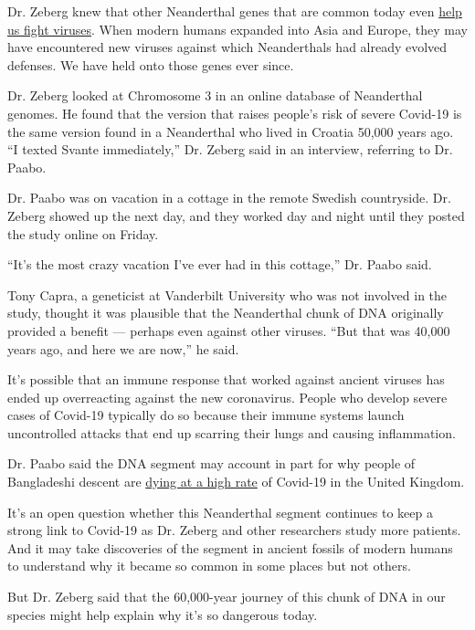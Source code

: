 Dr. Zeberg knew that other Neanderthal genes that are common today even
\href{https://www.nytimes3xbfgragh.onion/2018/10/04/science/neanderthal-genes-viruses.html}{help
us fight viruses}. When modern humans expanded into Asia and Europe,
they may have encountered new viruses against which Neanderthals had
already evolved defenses. We have held onto those genes ever since.

Dr. Zeberg looked at Chromosome 3 in an online database of Neanderthal
genomes. He found that the version that raises people's risk of severe
Covid-19 is the same version found in a Neanderthal who lived in Croatia
50,000 years ago. ``I texted Svante immediately,'' Dr. Zeberg said in an
interview, referring to Dr. Paabo.

Dr. Paabo was on vacation in a cottage in the remote Swedish
countryside. Dr. Zeberg showed up the next day, and they worked day and
night until they posted the study online on Friday.

``It's the most crazy vacation I've ever had in this cottage,'' Dr.
Paabo said.

Tony Capra, a geneticist at Vanderbilt University who was not involved
in the study, thought it was plausible that the Neanderthal chunk of DNA
originally provided a benefit --- perhaps even against other viruses.
``But that was 40,000 years ago, and here we are now,'' he said.

It's possible that an immune response that worked against ancient
viruses has ended up overreacting against the new coronavirus. People
who develop severe cases of Covid-19 typically do so because their
immune systems launch uncontrolled attacks that end up scarring their
lungs and causing inflammation.

Dr. Paabo said the DNA segment may account in part for why people of
Bangladeshi descent are
\href{https://www.theguardian.com/world/2020/jun/19/south-asians-in-uk-most-likely-to-die-of-covid-19-study-finds}{dying
at a high rate} of Covid-19 in the United Kingdom.

It's an open question whether this Neanderthal segment continues to keep
a strong link to Covid-19 as Dr. Zeberg and other researchers study more
patients. And it may take discoveries of the segment in ancient fossils
of modern humans to understand why it became so common in some places
but not others.

But Dr. Zeberg said that the 60,000-year journey of this chunk of DNA in
our species might help explain why it's so dangerous today.

